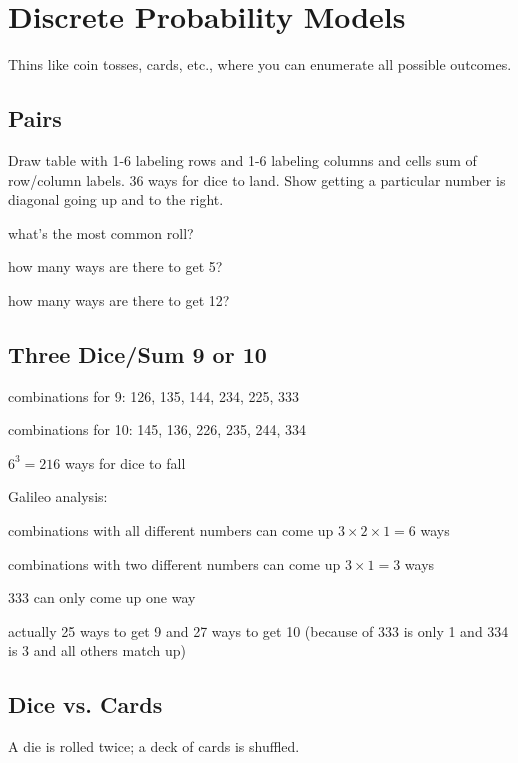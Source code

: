 \documentclass[landscape]{exam}
\begin{document}
  \section{Discrete Probability Models}
  Thins like coin tosses, cards, etc., where you can enumerate all possible
  outcomes.

  \subsection{Pairs}
  Draw table with 1-6 labeling rows and 1-6 labeling columns and cells sum of
  row/column labels. 36 ways for dice to land. Show getting a particular number
  is diagonal going up and to the right.

  \begin{itemize*}
    \item what's the most common roll?
    \item how many ways are there to get 5?
    \item how many ways are there to get 12?
  \end{itemize*}

  \subsection{Three Dice/Sum 9 or 10}

  \begin{itemize*}
    \item combinations for 9: 126, 135, 144, 234, 225, 333
    \item combinations for 10: 145, 136, 226, 235, 244, 334
    \item $6^3 = 216$ ways for dice to fall
  \end{itemize*}

  Galileo analysis:
  \begin{itemize*}
    \item combinations with all different numbers can come up 
      $3 \times 2 \times 1 = 6$ ways
    \item combinations with two different numbers can come up 
      $3 \times 1 = 3$ ways
    \item 333 can only come up one way
    \item actually 25 ways to get 9 and 27 ways to get 10 
      (because of 333 is only 1 and 334 is 3 and all others match up)
  \end{itemize*}

  \subsection{Dice vs. Cards}
  A die is rolled twice; a deck of cards is shuffled.
\end{document}
